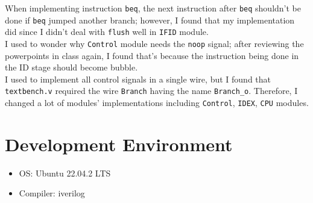 When implementing instruction \texttt{beq}, the next instruction after \texttt{beq} shouldn't be done if \texttt{beq} jumped another branch; however, I found that my implementation did since I didn't deal with \texttt{flush} well in \texttt{IFID} module.\\
I used to wonder why \texttt{Control} module needs the \texttt{noop} signal; after reviewing the powerpoints in class again, I found that's because the instruction being done in the ID stage should become bubble.\\
I used to implement all control signals in a single wire, but I found that \texttt{textbench.v} required the wire \texttt{Branch} having the name \texttt{Branch\_o}. Therefore, I changed a lot of modules' implementations including \texttt{Control}, \texttt{IDEX}, \texttt{CPU} modules.

\section{Development Environment}

\begin{itemize}
\item OS: Ubuntu 22.04.2 LTS
\item Compiler: iverilog
\end{itemize}
